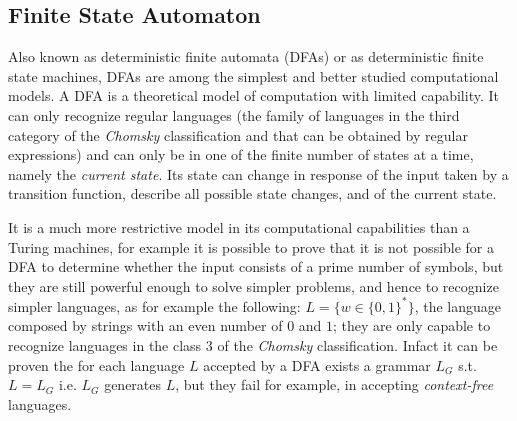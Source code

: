 \subsection{Finite State Automaton}\label{DFA}
Also known as deterministic finite automata (DFAs) or as deterministic finite
state machines, DFAs are among the simplest and better studied computational models.
A DFA is a theoretical model of computation with limited capability. It can only recognize regular languages (the family of languages in the third category of the \textit{Chomsky} classification and that can be obtained by regular expressions) and can only be in one of the finite number of states at a time, namely the \textit{current state}. Its state can change in response of the input taken by a
transition function, describe all possible state changes, and of the current state.
\begin{table}
 \caption{Tabular representation of a DFM transition function}
 \label{tab:tabularTransitionFunction}
\end{table} 
It is a much more restrictive model in its computational capabilities than a Turing
machines, for example it is possible to prove that it is not possible for a DFA to determine whether the input consists of a prime number of symbols,
but they are still powerful enough to solve simpler problems, and hence to recognize
simpler languages, as for example the following: $L=\{w \in \{0,1\}^*\}$, the language composed by strings with an even number of $0$ and $1$; they are only capable
to recognize languages in the class $3$ of the \textit{Chomsky} classification\cite{Chomsky:1956}. Infact it can be proven the for each language $L$ accepted by a DFA exists a grammar $L_G$ s.t. $ L=L_G$ i.e. $L_G$ generates $L$,
but they fail for example, in accepting \emph{context-free} languages.

